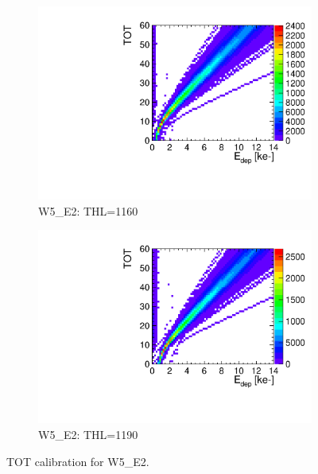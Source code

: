 \begin{figure}[htbp] \centering
  \begin{subfigure}[b]{0.45\textwidth}
    \includegraphics[width=\textwidth]{./figures/Calibration/TOTcalibration_W0005_E02_thresh1160.pdf}
    \caption{W5\_E2: THL=1160}
  \end{subfigure} \hfill
  \begin{subfigure}[b]{0.45\textwidth}
    \includegraphics[width=\textwidth]{./figures/Calibration/TOTcalibration_W0005_E02_thresh1190.pdf}
    \caption{W5\_E2: THL=1190}
  \end{subfigure}
  \caption{TOT calibration for W5\_E2.}
  \label{fig:TOTcalibW5E2}
\end{figure}

